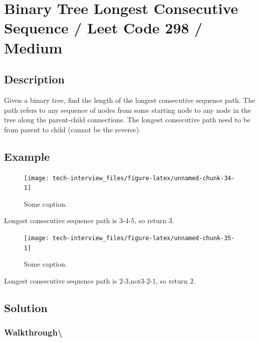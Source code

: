 \documentclass[]{book}
\begin{document}
\hypertarget{binary-tree-longest-consecutive-sequence-leet-code-298-medium}{%
\section{Binary Tree Longest Consecutive Sequence / Leet Code 298 / Medium}\label{binary-tree-longest-consecutive-sequence-leet-code-298-medium}}

\hypertarget{description-71}{%
\subsection{Description}\label{description-71}}

Given a binary tree, find the length of the longest consecutive sequence path.
The path refers to any sequence of nodes from some starting node to any node in the tree along the parent-child
connections. The longest consecutive path need to be from parent to child (cannot be the reverse).

\hypertarget{example-68}{%
\subsection{Example}\label{example-68}}

\begin{figure}
\texttt{[image: tech-interview\_files/figure-latex/unnamed-chunk-34-1]} \caption{Some caption.}\label{fig:unnamed-chunk-34}
\end{figure}

Longest consecutive sequence path is 3-4-5, so return 3.

\begin{figure}
\texttt{[image: tech-interview\_files/figure-latex/unnamed-chunk-35-1]} \caption{Some caption.}\label{fig:unnamed-chunk-35}
\end{figure}

Longest consecutive sequence path is 2-3,not3-2-1, so return 2.

\hypertarget{solution-48}{%
\subsection{Solution}\label{solution-48}}

\hypertarget{walkthrough-82}{%
\subsubsection{Walkthrough\textbackslash{}}\label{walkthrough-82}}
\end{document}
